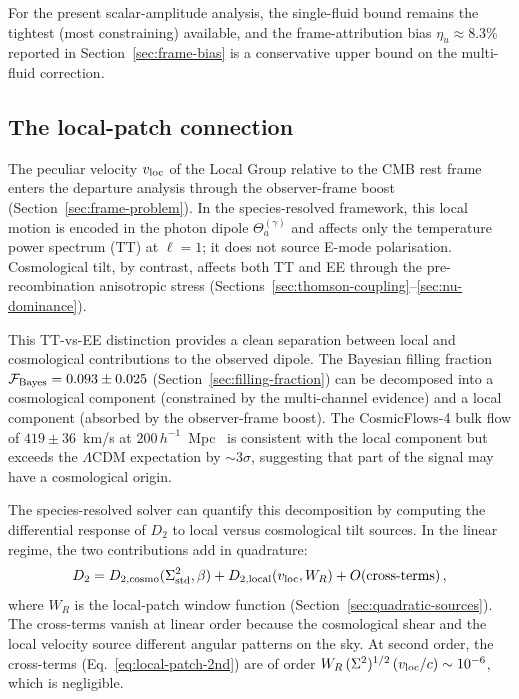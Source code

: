 For the present scalar-amplitude analysis, the single-fluid
bound remains the tightest (most constraining) available,
and the frame-attribution bias $\eta_{\dot{u}} \approx
8.3\%$ reported in Section~\ref{sec:frame-bias} is a
conservative upper bound on the multi-fluid correction.


\subsection{The local-patch connection}
\label{sec:disc-local-patch}

The peculiar velocity $v_{\rm loc}$ of the Local Group
relative to the CMB rest frame enters the departure
analysis through the observer-frame boost
(Section~\ref{sec:frame-problem}).  In the species-resolved
framework, this local motion is encoded in the photon
dipole $\Theta^{(\gamma)}_a$ and affects only the
temperature power spectrum (TT) at $\ell = 1$; it does not
source E-mode polarisation.  Cosmological tilt, by
contrast, affects both TT and EE through the pre-recombination
anisotropic stress
(Sections~\ref{sec:thomson-coupling}--\ref{sec:nu-dominance}).

This TT-vs-EE distinction provides a clean separation
between local and cosmological contributions to the
observed dipole.  The Bayesian filling fraction
$\mathcal{F}_{\rm Bayes} = 0.093 \pm 0.025$
(Section~\ref{sec:filling-fraction}) can be decomposed
into a cosmological component (constrained by the
multi-channel evidence) and a local component (absorbed by
the observer-frame boost).  The CosmicFlows-4 bulk flow
of $419 \pm 36$~km/s at
$200\,h^{-1}$~Mpc~\cite{Watkins2023} is consistent with
the local component but exceeds the $\Lambda$CDM
expectation by $\sim\!3\sigma$, suggesting that part of
the signal may have a cosmological origin.

The species-resolved solver can quantify this
decomposition by computing the differential response of
$D_2$ to local versus cosmological tilt sources.  In the
linear regime, the two contributions add in quadrature:
\begin{equation}\label{eq:D2-local-cosmo}
D_2 = D_{2,\rm cosmo}(\Sigma^2_{\mathrm{std}}, \beta)
    + D_{2,\rm local}(v_{\rm loc}, W_R)
    + O(\text{cross-terms})\,,
\end{equation}
where $W_R$ is the local-patch window function
(Section~\ref{sec:quadratic-sources}).  The cross-terms
vanish at linear order because the cosmological shear and
the local velocity source different angular
patterns on the sky.  At second order, the cross-terms
(Eq.~\ref{eq:local-patch-2nd}) are of order
$W_R\,(\Sigma^2)^{1/2}\,(v_{\rm loc}/c)
\sim 10^{-6}$, which is negligible.



